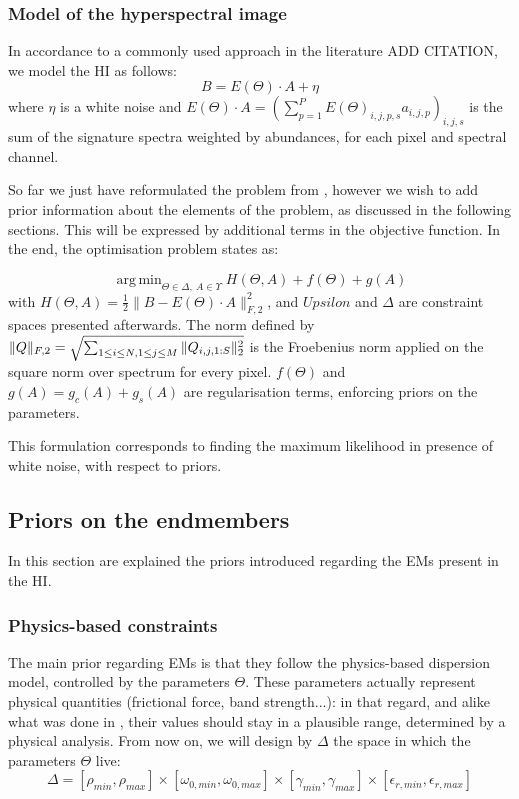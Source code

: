 \documentclass{article}
\DeclareMathOperator*{\argmin}{arg\,min}
\begin{document}
\subsubsection{Model of the hyperspectral image}

In accordance to a commonly used approach in the literature ADD CITATION, we model the HI as follows:
$$B = E(\Theta) \cdot A + \eta$$
where $\eta$ is a white noise and $E(\Theta) \cdot A = \left( \sum_{p=1}^P E(\Theta)_{i,j,p,s} a_{i,j,p} \right)_{i,j,s}$ is the sum of the signature spectra weighted by abundances, for each pixel and spectral channel.

So far we just have reformulated the problem from \cite{janiczek_differentiable_2020}, however we wish to add prior information about the elements of the problem, as discussed in the following sections. This will be expressed by additional terms in the objective function. In the end, the optimisation problem states as:

\begin{equation}
  \label{eq:objective}
  \argmin_{\Theta \in \Delta,\ A \in \Upsilon} H(\Theta, A) + f(\Theta) + g(A)
\end{equation}
with $H(\Theta, A) = \frac{1}{2} \|B - E(\Theta) \cdot A\|_{F, 2}^2$, and $Upsilon$ and $\Delta$ are constraint spaces presented afterwards. The norm defined by $\|Q\|_{F, 2} = \sqrt{\sum_{1 \leq i \leq N,\\1 \leq j \leq M} \|Q_{i, j, 1:S}\|_2^2}$ is the Froebenius norm applied on the square norm over spectrum for every pixel. $f(\Theta)$ and $g(A) = g_c(A) + g_s(A)$ are regularisation terms, enforcing priors on the parameters.

This formulation corresponds to finding the maximum likelihood in presence of white noise, with respect to priors.

\subsection{Priors on the endmembers}
In this section are explained the priors introduced regarding the EMs present in the HI.

\subsubsection{Physics-based constraints}

The main prior regarding EMs is that they follow the physics-based dispersion model, controlled by the parameters $\Theta$. These parameters actually represent physical quantities (frictional force, band strength...): in that regard, and alike what was done in \cite{janiczek_differentiable_2020}, their values should stay in a plausible range, determined by a physical analysis. From now on, we will design by $\Delta$ the space in which the parameters $\Theta$ live:
$$\Delta = [\rho_{min}, \rho_{max}] \times [\omega_{0, min}, \omega_{0, max}] \times [\gamma_{min}, \gamma_{max}] \times [\epsilon_{r, min}, \epsilon_{r, max}]$$
\end{document}
